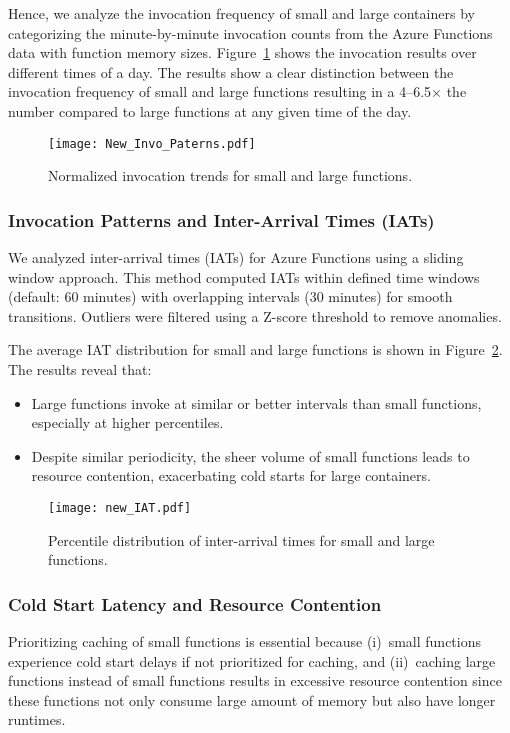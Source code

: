 Hence, we analyze the invocation frequency of small and large containers by categorizing the minute-by-minute invocation counts from the Azure Functions data with function memory sizes. 
Figure~\ref{fig:traffic_frequency} shows the invocation results over different times of a day.
The results show a clear distinction between the invocation frequency of small and large functions resulting in a 4–6.5$\times$ the number compared to large functions at any given time of the day. 

\begin{figure}[h]
    \centering
    \texttt{[image: New\_Invo\_Paterns.pdf]}
    \caption{Normalized invocation trends for small and large functions.}
    \label{fig:traffic_frequency}
\end{figure}


\subsubsection{Invocation Patterns and Inter-Arrival Times (IATs)}

We analyzed inter-arrival times (IATs) for Azure Functions using a sliding window approach. This method computed IATs within defined time windows (default: 60 minutes) with overlapping intervals (30 minutes) for smooth transitions. Outliers were filtered using a Z-score threshold to remove anomalies.

The average IAT distribution for small and large functions is shown in Figure~\ref{fig:iat_distribution}. The results reveal that:
\begin{itemize}
   \item Large functions invoke at similar or better intervals than small functions, especially at higher percentiles.
   \item Despite similar periodicity, the sheer volume of small functions leads to resource contention, exacerbating cold starts for large containers.
\end{itemize}

\begin{figure}[h]
   \centering
   \texttt{[image: new\_IAT.pdf]}
   \caption{Percentile distribution of inter-arrival times for small and large functions.}
   \label{fig:iat_distribution}
\end{figure}

\subsubsection{Cold Start Latency and Resource Contention}
Prioritizing caching of small functions is essential because (i)~small functions experience cold start delays if not prioritized for caching, and (ii)~caching large functions instead of small functions results in excessive resource contention since these functions not only consume large amount of memory but also have longer runtimes. 


